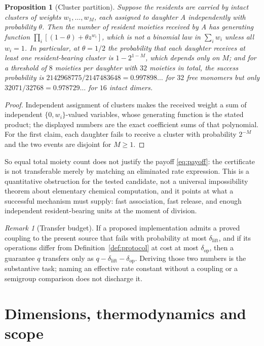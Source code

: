 \documentclass[11pt,a4paper]{article}
\theoremstyle{plain}
\newtheorem{proposition}[theorem]{Proposition}
\theoremstyle{definition}
\theoremstyle{remark}
\newtheorem{remark}[theorem]{Remark}
\begin{document}
\begin{proposition}[Cluster partition]\label{prop:cluster}
Suppose the residents are carried by intact clusters of weights $w_1,\dots,w_M$, each
assigned to daughter A independently with probability $\theta$. Then the number of
resident moieties received by A has generating function $\prod_{i}[(1-\theta)+\theta
z^{w_i}]$, which is not a binomial law in $\sum_i w_i$ unless all $w_i=1$. In particular,
at $\theta=1/2$ the probability that each daughter receives at least one resident-bearing
cluster is $1-2^{1-M}$, which depends only on $M$; and for a threshold of $8$ moieties per
daughter with $32$ moieties in total, the success probability is $2142968775/2147483648
=0.997898\ldots$ for $32$ free monomers but only $32071/32768=0.978729\ldots$ for $16$
intact dimers.
\end{proposition}

\begin{proof}
Independent assignment of clusters makes the received weight a sum of independent
$\{0,w_i\}$-valued variables, whose generating function is the stated product; the
displayed numbers are the exact coefficient sums of that polynomial. For the first claim,
each daughter fails to receive a cluster with probability $2^{-M}$ and the two events are
disjoint for $M\ge1$.
\end{proof}

So equal total moiety count does not justify the payoff \eqref{eq:payoff}: the certificate
is not transferable merely by matching an eliminated rate expression. This is a
quantitative obstruction for the tested candidate, not a universal impossibility theorem
about elementary chemical computation, and it points at what a successful mechanism must
supply: fast association, fast release, and enough independent resident-bearing units at
the moment of division.

\begin{remark}[Transfer budget]
If a proposed implementation admits a proved coupling to the present source that fails
with probability at most $\delta_{\mathrm{lift}}$, and if its operations differ from
Definition~\ref{def:protocol} at cost at most $\delta_{\mathrm{op}}$, then a guarantee $q$
transfers only as $q-\delta_{\mathrm{lift}}-\delta_{\mathrm{op}}$. Deriving those two
numbers is the substantive task; naming an effective rate constant without a coupling or a
semigroup comparison does not discharge it.
\end{remark}

\section{Dimensions, thermodynamics and scope}\label{sec:physical}
\end{document}
